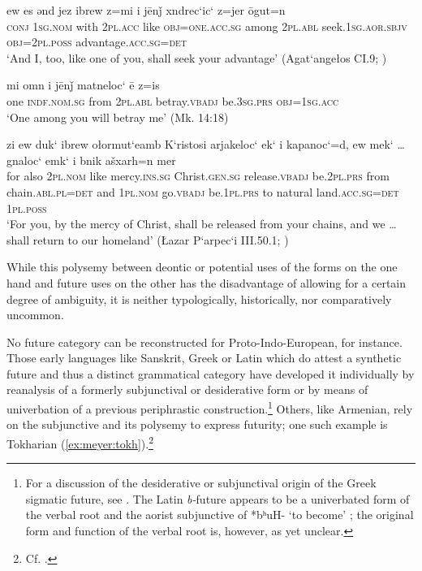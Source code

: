 \documentclass[output=paper,colorlinks,citecolor=brown]{langscibook}
\begin{document}
	\ea \label{ex:meyer:carm2}
	\gll ew es ǝnd jez ibrew z=mi i jēnǰ xndrec‘ic‘ z=jer ōgut=n\\
	\textsc{conj} \textsc{1sg.nom} with \textsc{2pl.acc} like \textsc{obj=one.acc.sg} among \textsc{2pl.abl} seek.\textsc{1sg.aor.sbjv} \textsc{obj=2pl.poss} advantage.\textsc{acc.sg=det}\\
	\glt ‘And I, too, like one of you, shall seek your advantage’ (Agat‘angełos CI.9; \citealt{Matenagirk2})
	\z {}
	
	\ea \label{ex:meyer:carm3}
	\gll mi omn i jēnǰ matneloc‘ ē z=is\\
	one \textsc{indf.nom.sg} from \textsc{2pl.abl} betray.\textsc{vbadj} be.\textsc{3sg.prs} \textsc{obj=1sg.acc}\\
	\glt ‘One among you will betray me’ (Mk. 14:18)
	\z {}
	
	\ea \label{ex:meyer:carm4}
	\gll zi ew duk‘ ibrew ołormut‘eamb K‘ristosi arjakeloc‘ ek‘ i kapanoc‘=d, ew mek‘ … gnaloc‘ emk‘ i bnik ašxarh=n mer\\
	for also \textsc{2pl.nom} like mercy.\textsc{ins.sg} Christ.\textsc{gen.sg} release.\textsc{vbadj} be.\textsc{2pl.prs} from chain.\textsc{abl.pl=det} and \textsc{1pl.nom} {} go.\textsc{vbadj} be.\textsc{1pl.prs} to natural land.\textsc{acc.sg=det} \textsc{1pl.poss}\\
	\glt ‘For you, by the mercy of Christ, shall be released from your chains, and we … shall return to our homeland’ (Łazar P‘arpec‘i III.50.1; \citealt{Matenagirk2})
	\z
	
	While this polysemy between deontic or potential uses of the forms on the one hand and future uses on the other has the disadvantage of allowing for a certain degree of ambiguity, it is neither typologically, historically, nor comparatively uncommon.
	
	No future category can be reconstructed for Proto-Indo-European, for instance. Those early languages like Sanskrit, Greek or Latin which do attest a synthetic future and thus a distinct grammatical category have developed it individually by reanalysis of a formerly subjunctival or desiderative form or by means of univerbation of a previous periphrastic construction.\footnote{For a discussion of the desiderative or subjunctival origin of the Greek sigmatic future, 
    see \citet[441--452]{Willi2018}. The Latin \textit{b-}future appears to be a univerbated form of the verbal root and the aorist subjunctive of *bʰuH- ‘to become’ \citep[415]{Weiss2009}; the original form and function of the verbal root is, however, as yet unclear.} Others, like Armenian, rely on the subjunctive and its polysemy to express futurity; one such example is Tokharian (\ref{ex:meyer:tokh}).\footnote{Cf. \citet[265–266]{Malzahn2010}.}
	
\end{document}

